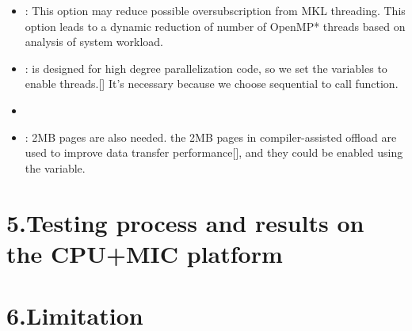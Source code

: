 \documentclass{article}
\begin{document}
\begin{itemize}%

\item{}
:\mdbr
{}This option may reduce possible oversubscription from MKL threading. This option leads to a dynamic reduction of number of OpenMP* threads based on analysis of system workload.%

\item{}
:\mdbr
{} is designed for high degree parallelization code, so we set the variables to enable  threads.[] It's necessary because we choose sequential  to call  function.%

\item{}

\item{}
:\mdbr
{}2MB pages are also needed. the 2MB pages in compiler-assisted offload are used to improve data transfer performance[], and they could be enabled using the  variable.%
\end{itemize}%

\section{5.\hspace*{0.5em}Testing process and results on the CPU+MIC platform}\label{sec-testing-process-and-results-on-the-cpumic-platform}%

\section{6.\hspace*{0.5em}Limitation}\label{sec-limitation}%
\end{document}
